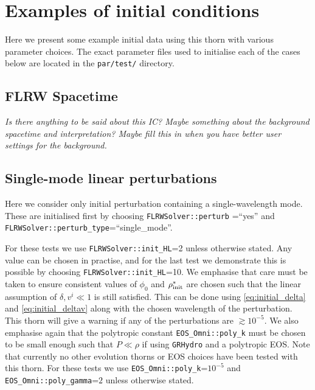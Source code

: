 \section{Examples of initial conditions} \label{sec:tests}

Here we present some example initial data using this thorn with various parameter choices. The exact parameter files used to initialise each of the cases below are located in the \texttt{par/test/} directory. 

\subsection{FLRW Spacetime}

\emph{Is there anything to be said about this IC? Maybe something about the background spacetime and interpretation? Maybe fill this in when you have better user settings for the background.}


\subsection{Single-mode linear perturbations}

Here we consider only initial perturbation containing a single-wavelength mode. These are initialised first by choosing \texttt{FLRWSolver::perturb} =``yes'' and \texttt{FLRWSolver::perturb\_type}=``single\_mode''. 

For these tests we use \texttt{FLRWSolver::init\_HL}=2 unless otherwise stated. Any value can be chosen in practise, and for the last test we demonstrate this is possible by choosing \texttt{FLRWSolver::init\_HL}=10. We emphasise that care must be taken to ensure consistent values of $\phi_0$ and $\rho^*_{\rm init}$ are chosen such that the linear assumption of $\delta, v^i \ll 1$ is still satisfied. This can be done using \eqref{eq:initial_delta} and \eqref{eq:initial_deltav} along with the chosen wavelength of the perturbation. This thorn will give a warning if any of the perturbations are $\gtrsim 10^{-5}$. We also emphasise again that the polytropic constant \texttt{EOS\_Omni::poly\_k} must be chosen to be small enough such that $P \ll \rho$ if using \texttt{GRHydro} and a polytropic EOS. Note that currently no other evolution thorns or EOS choices have been tested with this thorn. For these tests we use \texttt{EOS\_Omni::poly\_k}=$10^{-5}$ and \texttt{EOS\_Omni::poly\_gamma}=$2$ unless otherwise stated.


